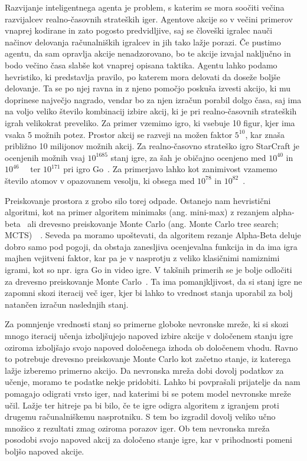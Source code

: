 \documentclass[a4paper, 12pt]{book}
\begin{document}
Razvijanje inteligentnega agenta je problem, s katerim se mora soočiti večina razvijalcev realno-časovnih strateških iger. 
Agentove akcije so v večini primerov vnaprej kodirane in zato pogosto predvidljive, saj se človeški igralec nauči načinov delovanja računalniških igralcev in jih tako lažje porazi.
Če pustimo agentu, da sam opravlja akcije nenadzorovano, bo te akcije izvajal naključno in bodo večino časa slabše kot vnaprej opisana taktika.
Agentu lahko podamo hevristiko, ki predstavlja pravilo, po katerem mora delovati da doseže boljše delovanje.
Ta se po njej ravna in z njeno pomočjo poskuša izvesti akcijo, ki mu doprinese največjo nagrado, vendar bo za njen izračun porabil dolgo časa, saj ima na voljo veliko število kombinacij izbire akcij, ki je pri realno-časovnih strateških igrah velikokrat preveliko.
Za primer vzemimo igro, ki vsebuje 10 figur, kjer ima vsaka 5 možnih potez.
Prostor akcij se razveji na možen faktor $5^{10}$, kar znaša približno 10 milijonov možnih akcij.
Za realno-časovno strateško igro StarCraft je ocenjenih možnih vsaj $10^{1685}$ stanj igre, za šah je običajno ocenjeno med $10^{40}$ in $10^{46}$~{\cite{chinchalkar1996upper}}~{\cite{steinerberger2015number}} ter $10^{171}$ pri igro Go~\cite{ontanon2017combinatorial}.
Za primerjavo lahko kot zanimivost vzamemo število atomov v opazovanem vesolju, ki obsega med $10^{78}$ in $10^{82}$~\cite{atoms}.

Preiskovanje prostora z grobo silo torej odpade. 
Ostanejo nam hevristični algoritmi, kot na primer algoritem minimaks (ang. mini-max) z rezanjem alpha-beta~{\cite{knuth1975analysis}} ali drevesno preiskovanje Monte Carlo (ang. Monte Carlo tree search; MCTS)~{\cite{kocsis2006bandit}}~{\cite{coulom2006efficient}}. 
Seveda pa moramo upoštevati, da algoritem rezanje Alpha-Beta deluje dobro samo pod pogoji, da obstaja zanesljiva ocenjevalna funkcija in da ima igra majhen vejitveni faktor, kar pa je v nasprotju z veliko klasičnimi namiznimi igrami, kot so npr. igra Go in video igre. 
V takšnih primerih se je bolje odločiti za drevesno preiskovanje Monte Carlo~\cite{chaslot2008monte}.
Ta ima pomanjkljivost, da si stanj igre ne zapomni skozi iteracij več iger, kjer bi lahko to vrednost stanja uporabil za bolj natančen izračun naslednjih stanj.

Za pomnjenje vrednosti stanj so primerne globoke nevronske mreže, ki si skozi mnogo iteracij učenja izboljšujejo napoved izbire akcije v določenem stanju igre oziroma izboljšajo svojo napoved določenega izhoda ob določenem vhodu.
Ravno to potrebuje drevesno preiskovanje Monte Carlo kot začetno stanje, iz katerega lažje izberemo primerno akcijo.
Da nevronska mreža dobi dovolj podatkov za učenje, moramo te podatke nekje pridobiti.
Lahko bi povprašali prijatelje da nam pomagajo odigrati vrsto iger, nad katerimi bi se potem model nevronske mreže učil.
Lažje ter hitreje pa bi bilo, če te igre odigra algoritem z igranjem proti drugemu računalniškemu nasprotniku.
S tem bo izgradil dovolj veliko učno množico z rezultati zmag oziroma porazov iger. 
Ob tem nevronska mreža posodobi svojo napoved akcij za določeno stanje igre, kar v prihodnosti pomeni boljšo napoved akcije.
\end{document}
